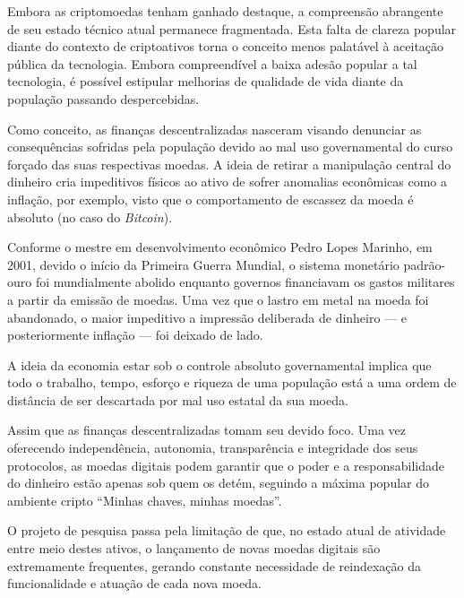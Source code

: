 
Embora as criptomoedas tenham ganhado destaque, a compreensão abrangente de seu estado técnico atual permanece fragmentada. Esta falta de clareza popular diante do contexto de criptoativos torna o conceito menos palatável à aceitação pública da tecnologia. Embora compreendível a baixa adesão popular a tal tecnologia, é possível estipular melhorias de qualidade de vida diante da população passando despercebidas.

Como conceito, as finanças descentralizadas nasceram visando denunciar as consequências sofridas pela população devido ao mal uso governamental do curso forçado das suas respectivas moedas. A ideia de retirar a manipulação central do dinheiro cria impeditivos físicos ao ativo de sofrer anomalias econômicas como a inflação, por exemplo, visto que o comportamento de escassez da moeda é absoluto (no caso do \textit{Bitcoin}).

Conforme o mestre em desenvolvimento econômico Pedro Lopes Marinho, em 2001, devido o início da Primeira Guerra Mundial, o sistema monetário padrão-ouro foi mundialmente abolido enquanto governos financiavam os gastos militares a partir da emissão de moedas. Uma vez que o lastro em metal na moeda foi abandonado, o maior impeditivo a impressão deliberada de dinheiro — e posteriormente inflação — foi deixado de lado.

A ideia da economia estar sob o controle absoluto governamental implica que todo o trabalho, tempo, esforço e riqueza de uma população está a uma ordem de distância de ser descartada por mal uso estatal da sua moeda. 

Assim que as finanças descentralizadas tomam seu devido foco. Uma vez oferecendo independência, autonomia, transparência e integridade dos seus protocolos, as moedas digitais podem garantir que o poder e a responsabilidade do dinheiro estão apenas sob quem os detém, seguindo a máxima popular do ambiente cripto ``Minhas chaves, minhas moedas''.


O projeto de pesquisa passa pela limitação de que, no estado atual de atividade entre meio destes ativos, o lançamento de novas moedas digitais são extremamente frequentes, gerando constante necessidade de reindexação da funcionalidade e atuação de cada nova moeda.
